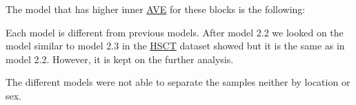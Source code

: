 \documentclass[
  12pt,
  a4paper,
  twoside,
  openright]{book}
\begin{document}
The model that has higher inner \protect\hyperlink{acronyms_AVE}{AVE} for these blocks is the following:

\begin{table}[H]

\caption[Model 2.2 of the Morgan dataset.]{\label{tab:morgan-model2-2}Relationships between the different blocks in the Morgan dataset for model 2.2. 0 indicates no relationship and 1 indicates a strong relationship. The transcriptome is weakly related to the microbiome and location but much stronger related to the demographic variables.}
\centering
{}
\end{table}

Each model is different from previous models.
After model 2.2 we looked on the model similar to model 2.3 in the \protect\hyperlink{acronyms_HSCT}{HSCT} dataset showed but it is the same as in model 2.2.
However, it is kept on the further analysis.

The different models were not able to separate the samples neither by location or sex.
\end{document}
